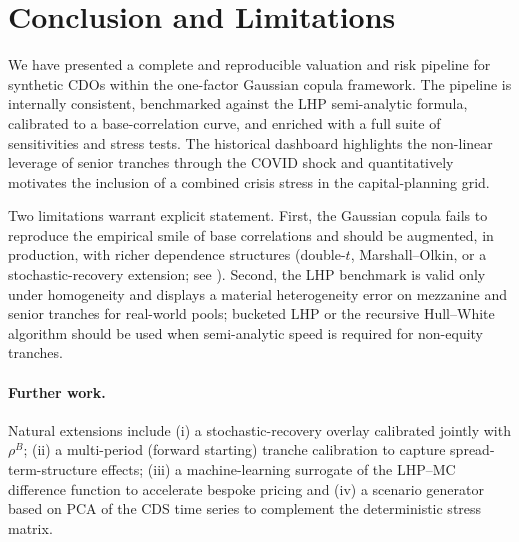 \documentclass[11pt,a4paper]{article}
\newcommand{\1}{\mathbf{1}}
\begin{document}
\section{Conclusion and Limitations}\label{sec:conclusion}

We have presented a complete and reproducible valuation and risk
pipeline for synthetic CDOs within the one-factor Gaussian copula
framework. The pipeline is internally consistent, benchmarked against
the LHP semi-analytic formula, calibrated to a base-correlation curve,
and enriched with a full suite of sensitivities and stress tests. The
historical dashboard highlights the non-linear leverage of senior
tranches through the COVID shock and quantitatively motivates the
inclusion of a combined crisis stress in the capital-planning grid.

Two limitations warrant explicit statement. First, the Gaussian
copula fails to reproduce the empirical smile of base correlations
and should be augmented, in production, with richer dependence
structures (double-\(t\), Marshall--Olkin, or a stochastic-recovery
extension; see \citealp{andersen2003,burtschell2007}). Second, the
LHP benchmark is valid only under homogeneity and displays a
material heterogeneity error on mezzanine and senior tranches for
real-world pools; bucketed LHP or the recursive Hull--White algorithm
\citep{hull2004} should be used when semi-analytic speed is required
for non-equity tranches.

\paragraph{Further work.}
Natural extensions include (i) a stochastic-recovery overlay
calibrated jointly with \(\rho^{B}\); (ii) a multi-period (forward
starting) tranche calibration to capture spread-term-structure
effects; (iii) a machine-learning surrogate of the LHP--MC difference
function to accelerate bespoke pricing and (iv) a scenario generator
based on PCA of the CDS time series to complement the deterministic
stress matrix.
\end{document}
